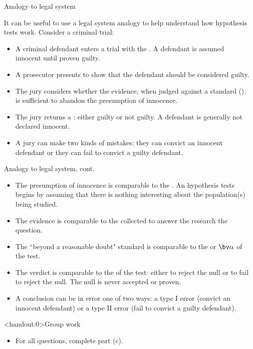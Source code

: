 \documentclass[xcolor=table, aspectratio=169, bigger, handout]{beamer}
\begin{document}
\begin{frame}{Analogy to legal system}
\begin{block}{}
It can be useful to use a legal system analogy to help understand how hypothesis tests work. Consider a criminal trial:
\begin{itemize}
\pause\item A criminal defendant enters a trial with the . A defendant is assumed innocent until proven guilty.
\pause\item A prosecutor presents  to show that the defendant should be considered guilty.
\pause\item The jury considers whether the evidence, when judged against a standard (), is sufficient to abandon the presumption of innocence.
\pause\item The jury returns a : either guilty or not guilty. A defendant is generally not declared innocent.   
\pause\item A jury can make two kinds of mistakes: they can convict an innocent defendant or they can fail to convict a guilty defendant.
\end{itemize}
\end{block}
\end{frame}

\begin{frame}{Analogy to legal system, cont.}
\begin{block}{}
\begin{itemize}
\item The presumption of innocence is comparable to the . An hypothesis tests begins by assuming that there is nothing interesting about the population(s) being studied.
\pause\item The evidence is comparable to the  collected to answer the research the question.
\pause\item The ``beyond a reasonable doubt" standard is comparable to the  or $\bv \alpha$ of the test.
\pause\item The verdict is comparable to the  of the test: either to reject the null or to fail to reject the null. The null is never accepted or proven.
\pause\item A conclusion can be in error one of two ways: a type I error (convict an innocent defendant) or a type II error (fail to convict a guilty defendant).
\end{itemize}
\end{block}
\end{frame}

\begin{frame}<handout:0>{Group work}
\begin{block}{}
\large
\begin{itemize}
\item For all questions, complete part (c).
\end{itemize}
\end{block}
\end{frame}
\end{document}
